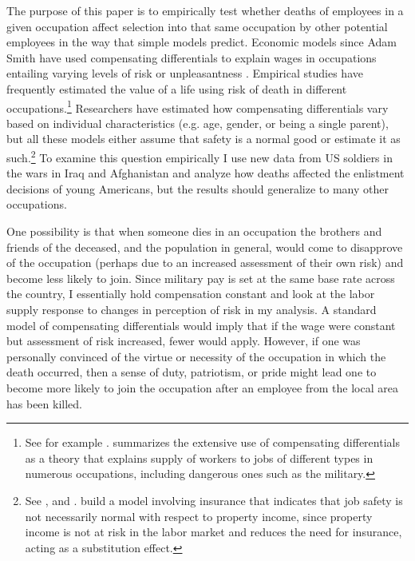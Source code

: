 \documentclass[12pt] {article}
\begin{document}
The purpose of this paper is to empirically test whether deaths of employees in a given occupation affect selection into that same occupation by other potential employees in the way that simple models predict. Economic models since Adam Smith have used compensating differentials to explain wages in occupations entailing varying levels of risk or unpleasantness \citep{AdamSmith}. Empirical studies have frequently estimated  the value of a life using risk of death in different occupations.\footnote{See for example \cite{thaler1976value}. \cite{RosenOccChoiceHandbook} summarizes the extensive use of compensating differentials as a theory that explains supply of workers to jobs of different types in numerous occupations, including dangerous ones such as the military.} Researchers have estimated how compensating differentials vary based on individual characteristics (e.g. age, gender, or being a single parent), but all these models either assume that safety is a normal good or estimate it as such.\footnote{See \cite{DeLeireLevy2004}, \cite{BiddleZarkin} and \cite{garen1988compensating}. \cite{thaler1976value} build a model involving insurance that indicates that job safety is not necessarily normal with respect to property income, since property income is not at risk in the labor market and reduces the need for insurance, acting as a substitution effect.} To examine this question empirically I use new data from US soldiers in the wars in Iraq and Afghanistan and analyze how deaths affected the enlistment decisions of young Americans, but the results should generalize to many other occupations.

One possibility is that when someone dies in an occupation the brothers and friends of the deceased, and the population in general, would come to disapprove of the occupation (perhaps due to an increased assessment of their own risk) and become less likely to join. Since military pay is set at the same base rate across the country, I essentially hold compensation constant and look at the labor supply response to changes in perception of risk in my analysis. A standard model of compensating differentials would imply that if the wage were constant but assessment of risk increased, fewer would apply. However, if one was personally convinced of the virtue or necessity of the occupation in which the death occurred, then a sense of duty, patriotism, or pride might lead one to become more likely to join the occupation after an employee from the local area has been killed.  
\end{document}
